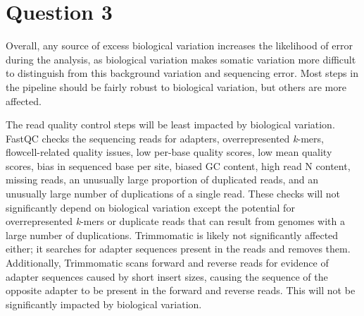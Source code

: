 \section{Question 3}


Overall, any source of excess biological variation increases the likelihood of error during the analysis, as biological variation makes somatic variation more difficult to distinguish from this background variation and sequencing error. Most steps in the pipeline should be fairly robust to biological variation, but others are more affected.

The read quality control steps will be least impacted by biological variation. FastQC checks the sequencing reads for adapters, overrepresented \textit{k}-mers, flowcell-related quality issues, low per-base quality scores, low mean quality scores, bias in sequenced base per site, biased GC content, high read N content, missing reads, an unusually large proportion of duplicated reads, and an unusually large number of duplications of a single read. These checks will not significantly depend on biological variation except the potential for overrepresented \textit{k}-mers or duplicate reads that can result from genomes with a large number of duplications. Trimmomatic is likely not significantly affected either; it searches for adapter sequences present in the reads and removes them. Additionally, Trimmomatic scans forward and reverse reads for evidence of adapter sequences caused by short insert sizes, causing the sequence of the opposite adapter to be present in the forward and reverse reads. This will not be significantly impacted by biological variation.



